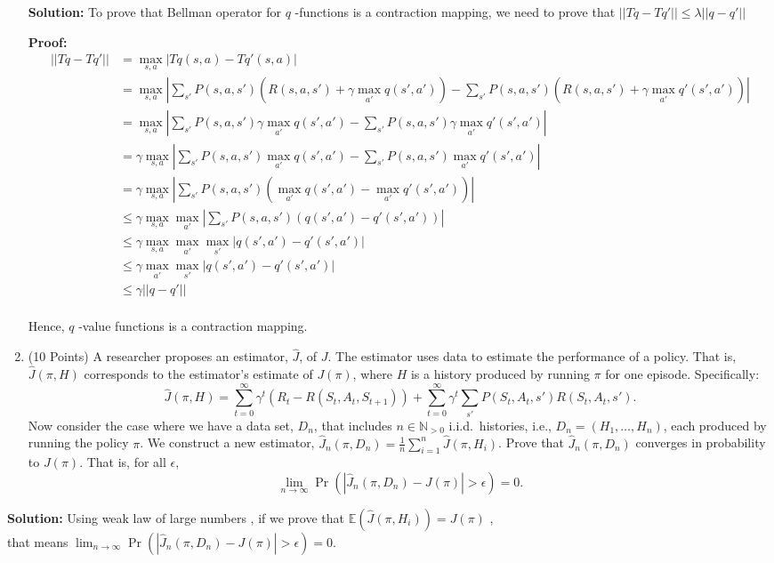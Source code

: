 \documentclass{article}
\begin{document}
\begin{enumerate}
    \textbf{Solution:} To prove that Bellman operator for $q$ -functions is a contraction mapping, we need to prove that $||Tq - Tq'|| \leq \lambda ||q - q'||$
    
    \textbf{Proof:} \\
    \begin{align}    
    ||Tq - Tq'|| &= \max_{s,a} | Tq(s,a) - Tq'(s,a) | \nonumber \\
    		    &=\max_{s,a} | \sum_{s'}P(s,a,s')\left ( R(s,a,s') + \gamma \max_{a'} q(s',a')\right ) - \sum_{s'}P(s,a,s')\left ( R(s,a,s') + \gamma \max_{a'} q'(s',a')\right )| \nonumber \\
		    &=\max_{s,a} | \sum_{s'}P(s,a,s') \gamma \max_{a'} q(s',a') - \sum_{s'}P(s,a,s') \gamma \max_{a'} q'(s',a') | \nonumber\\
		    &=\gamma\max_{s,a} | \sum_{s'}P(s,a,s') \max_{a'} q(s',a') - \sum_{s'}P(s,a,s') \max_{a'} q'(s',a') | \nonumber\\
		    &=\gamma\max_{s,a} | \sum_{s'}P(s,a,s') \left (\max_{a'} q(s',a') - \max_{a'} q'(s',a') \right )| \nonumber\\
		    &\leq \gamma\max_{s,a}\max_{a'} | \sum_{s'}P(s,a,s') \left ( q(s',a') - q'(s',a') \right )| \nonumber\\
		    &\leq \gamma\max_{s,a}\max_{a'} \max_{s'} |q(s',a') - q'(s',a')| \nonumber\\ 
		    &\leq \gamma \max_{a'} \max_{s'} |q(s',a') - q'(s',a')| \tag{Removing max over s,a} \nonumber\\
		    &\leq \gamma ||q - q'|| \tag{By Using max norm} \\
    \end{align}
    
    Hence, $q$ -value functions is a contraction mapping.
    \item (10 Points) A researcher proposes an estimator, $\hat J$, of $J$. The estimator uses data to estimate the performance of a policy. That is, $\hat J(\pi,H)$ corresponds to the estimator's estimate of $J(\pi)$, where $H$ is a history produced by running $\pi$ for one episode. Specifically:
    $$
    \hat J(\pi,H) = \sum_{t=0}^\infty \gamma^t \left ( R_t - R(S_t,A_t,S_{t+1})\right ) + \sum_{t=0}^\infty \gamma^t \sum_{s'} P(S_t,A_t,s')R(S_t,A_t,s').
    $$
    Now consider the case where we have a data set, $D_n$, that includes $n \in \mathbb N_{>0}$ i.i.d.~histories, i.e., $D_n=(H_1,\dotsc,H_n)$, each produced by running the policy $\pi$. We construct a new estimator, $\hat J_n(\pi,D_n)=\frac{1}{n}\sum_{i=1}^n \hat J(\pi,H_i)$. Prove that $\hat J_n(\pi,D_n)$ converges in probability to $J(\pi)$. That is, for all $\epsilon$,
    $$
    \lim_{n\to\infty} \Pr \left ( | \hat J_n(\pi,D_n) - J(\pi) | > \epsilon \right ) = 0.
    $$
\end{enumerate}
\textbf{Solution:}  Using  weak law of large numbers , if we prove that $\mathbb E(\hat J(\pi,H_i))  = J(\pi)$ , \\
that means $\lim_{n\to\infty} \Pr \left ( | \hat J_n(\pi,D_n) - J(\pi) | > \epsilon \right ) = 0.$ \\
\end{document}

